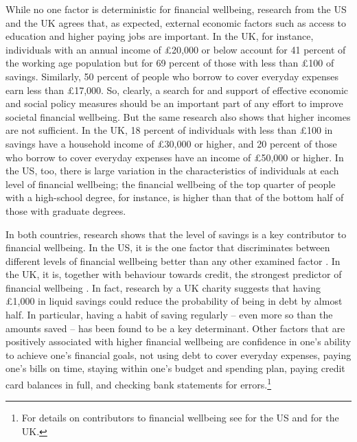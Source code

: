 While no one factor is deterministic for financial wellbeing, research from the
US \citep{cfpb2017financial} and the UK \citep{mps2018building} agrees that, as
expected, external economic factors such as access to education and higher
paying jobs are important. In the UK, for instance, individuals with an annual
income of \pounds20,000 or below account for 41 percent of the working age
population but for 69 percent of those with less than \pounds100 of savings.
Similarly, 50 percent of people who borrow to cover everyday expenses earn less
than \pounds17,000. So, clearly, a search for and support of effective economic
and social policy measures should be an important part of any effort to improve
societal financial wellbeing. But the same research also shows that higher
incomes are not sufficient. In the UK, 18 percent of individuals with less than
\pounds 100 in savings have a household income of \pounds30,000 or higher, and
20 percent of those who borrow to cover everyday expenses have an income of
\pounds50,000 or higher. In the US, too, there is large variation in the
characteristics of individuals at each level of financial wellbeing; the
financial wellbeing of the top quarter of people with a high-school degree, for
instance, is higher than that of the bottom half of those with graduate
degrees.

In both countries, research shows that the level of savings is a key
contributor to financial wellbeing. In the US, it is the one factor that
discriminates between different levels of financial wellbeing better than any
other examined factor \citep{cfpb2017financial}. In the UK, it is, together
with behaviour towards credit, the strongest predictor of financial wellbeing
\citep{mps2018building}. In fact, research by a UK charity suggests that having
\pounds1,000 in liquid savings could reduce the probability of being in debt by
almost half. In particular, having a habit of saving regularly -- even more so
than the amounts saved -- has been found to be a key determinant. Other
factors that are positively associated with higher financial wellbeing are
confidence in one's ability to achieve one's financial goals, not using debt to
cover everyday expenses, paying one's bills on time, staying within one's budget
and spending plan, paying credit card balances in full, and checking bank
statements for errors.\footnote{For details on contributors to financial
wellbeing see \citep{cfpb2017financial} for the US and \citet{mps2018building}
for the UK.}

